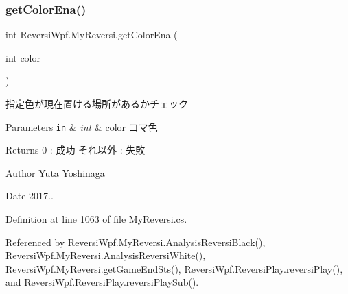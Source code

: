 \subsubsection{\texorpdfstring{get\+Color\+Ena()}{getColorEna()}}
{\footnotesize\ttfamily int Reversi\+Wpf.\+My\+Reversi.\+get\+Color\+Ena (\begin{DoxyParamCaption}\item[{int}]{color }\end{DoxyParamCaption})}



指定色が現在置ける場所があるかチェック 


\begin{DoxyParams}[1]{Parameters}
\mbox{\tt in}  & {\em int} & color コマ色 \\
\hline
\end{DoxyParams}
\begin{DoxyReturn}{Returns}
0 \+: 成功 それ以外 \+: 失敗 
\end{DoxyReturn}
\begin{DoxyAuthor}{Author}
Yuta Yoshinaga 
\end{DoxyAuthor}
\begin{DoxyDate}{Date}
2017.. 
\end{DoxyDate}


Definition at line 1063 of file My\+Reversi.\+cs.



Referenced by Reversi\+Wpf.\+My\+Reversi.\+Analysis\+Reversi\+Black(), Reversi\+Wpf.\+My\+Reversi.\+Analysis\+Reversi\+White(), Reversi\+Wpf.\+My\+Reversi.\+get\+Game\+End\+Sts(), Reversi\+Wpf.\+Reversi\+Play.\+reversi\+Play(), and Reversi\+Wpf.\+Reversi\+Play.\+reversi\+Play\+Sub().

